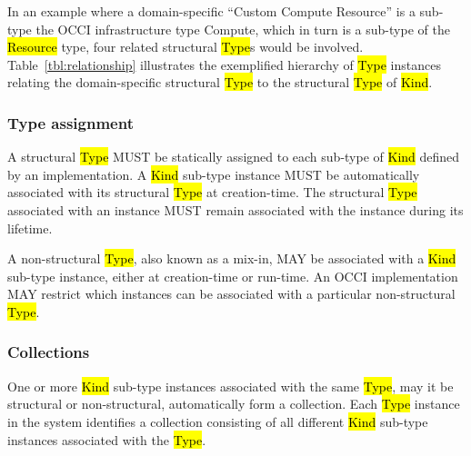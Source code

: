 \documentclass[10pt,a4paper,british]{article}
\begin{document}
In an example where a domain-specific ``Custom Compute Resource'' is a sub-type
the OCCI infrastructure type Compute, which in turn is a sub-type of the
\hl{Resource} type, four related structural \hl{Type}s would be involved.
%
Table~\ref{tbl:relationship} illustrates the exemplified hierarchy of \hl{Type}
instances relating the domain-specific structural \hl{Type} to the structural
\hl{Type} of \hl{Kind}.


\subsubsection{Type assignment}
\label{sec:type_assignment}
A structural \hl{Type} MUST be statically assigned to each sub-type of
\hl{Kind} defined by an implementation. A \hl{Kind} sub-type instance MUST be
automatically associated with its structural \hl{Type} at creation-time.  The
structural \hl{Type} associated with an instance MUST remain associated with the
instance during its lifetime.

A non-structural \hl{Type}, also known as a mix-in, MAY be associated with a
\hl{Kind} sub-type instance, either at creation-time or run-time. An OCCI
implementation MAY restrict which instances can be associated with a particular
non-structural \hl{Type}.

\subsubsection{Collections}
\label{sec:collection}
One or more \hl{Kind} sub-type instances associated with the same \hl{Type},
may it be structural or non-structural, automatically form a collection.
Each \hl{Type} instance in the system identifies a collection consisting of all
different \hl{Kind} sub-type instances associated with the \hl{Type}.
\end{document}
